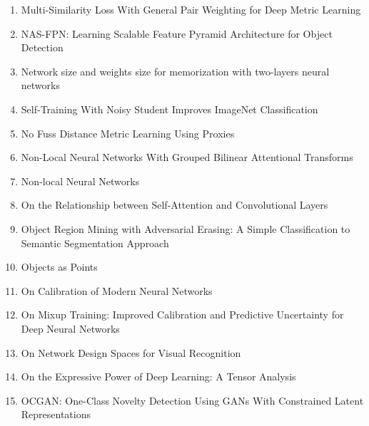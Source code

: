 \documentclass[acmlarge]{acmart}
\begin{document}
\begin{enumerate}
	\item Multi-Similarity Loss With General Pair Weighting for Deep Metric Learning \cite{Wang2019MultiSimilarityLW} 

	\item NAS-FPN: Learning Scalable Feature Pyramid Architecture for Object Detection \cite{Ghiasi2019NASFPNLS} 

	\item Network size and weights size for memorization with two-layers neural networks \cite{Bubeck2020NetworkSA} 

	\item Self-Training With Noisy Student Improves ImageNet Classification \cite{Xie2020SelfTrainingWN} 

	\item No Fuss Distance Metric Learning Using Proxies \cite{MovshovitzAttias2017NoFD} 

	\item Non-Local Neural Networks With Grouped Bilinear Attentional Transforms \cite{Chi2020NonLocalNN} 

	\item Non-local Neural Networks \cite{Wang2018NonlocalNN} 

	\item On the Relationship between Self-Attention and Convolutional Layers \cite{Cordonnier2020OnTR} 

	\item Object Region Mining with Adversarial Erasing: A Simple Classification to Semantic Segmentation Approach \cite{Wei2017ObjectRM} 

	\item Objects as Points \cite{Zhou2019ObjectsAP} 

	\item On Calibration of Modern Neural Networks \cite{Guo2017OnCO} 

	\item On Mixup Training: Improved Calibration and Predictive Uncertainty for Deep Neural Networks \cite{Thulasidasan2019OnMT} 

	\item On Network Design Spaces for Visual Recognition \cite{Radosavovic2019OnND} 

	\item On the Expressive Power of Deep Learning: A Tensor Analysis \cite{Cohen2015OnTE} 

	\item OCGAN: One-Class Novelty Detection Using GANs With Constrained Latent Representations \cite{Perera2019OCGANON} 


\end{enumerate}
\end{document}
